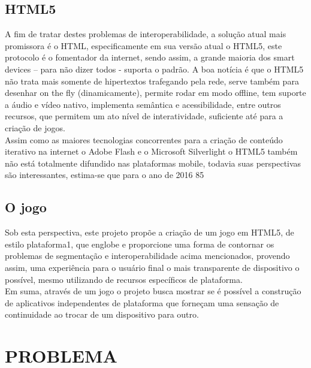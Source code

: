\documentclass{article}
\begin{document}
\subsection{HTML5}
	A fim de tratar destes problemas de interoperabilidade, a solução atual mais promissora é o HTML, especificamente em sua versão atual o HTML5, este protocolo é o fomentador da internet, sendo assim, a grande maioria dos smart devices – para não dizer todos - suporta o padrão. A boa notícia é que o HTML5 não trata mais somente de hipertextos trafegando pela rede, serve também para desenhar on the fly (dinamicamente), permite rodar em modo offline, tem suporte a áudio e vídeo nativo, implementa semântica e acessibilidade, entre outros recursos, que permitem um ato nível de interatividade, suficiente até para a criação de jogos.
\\
	Assim como as  maiores tecnologias concorrentes para a criação de conteúdo iterativo na internet o Adobe Flash e o Microsoft Silverlight o HTML5 também não está totalmente difundido nas plataformas mobile, todavia suas perspectivas são interessantes, estima-se que para o ano de 2016 85%

\subsection{O jogo}

Sob esta perspectiva, este projeto propõe  a criação de um jogo em HTML5, de estilo plataforma1, que englobe e proporcione uma forma de contornar os problemas de segmentação e interoperabilidade acima mencionados, provendo assim, uma experiência para o usuário final o mais transparente de dispositivo o possível, mesmo utilizando de recursos específicos de plataforma.
\\
	Em suma, através de um jogo o projeto busca mostrar se é possível a construção de aplicativos independentes de plataforma que forneçam uma sensação de continuidade ao trocar de um dispositivo para outro.

\section{PROBLEMA}
\end{document}
